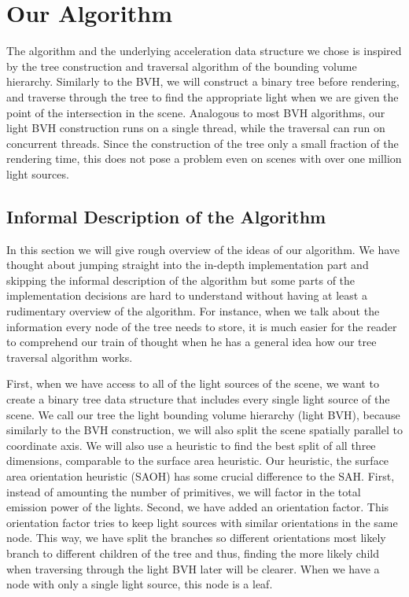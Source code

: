 
\chapter{Our Algorithm}
\label{ch:alg}

The algorithm and the underlying acceleration data structure we chose is inspired by the tree construction and traversal algorithm of the bounding volume hierarchy. Similarly to the BVH, we will construct a binary tree before rendering, and traverse through the tree to find the appropriate light when we are given the point of the intersection in the scene. Analogous to most BVH algorithms, our light BVH construction runs on a single thread, while the traversal can run on concurrent threads. Since the construction of the tree only a small fraction of the rendering time, this does not pose a problem even on scenes with over one million light sources.

\section{Informal Description of the Algorithm}
\label{sec:alg:idea}

In this section we will give rough overview of the ideas of our algorithm. We have thought about jumping straight into the in-depth implementation part and skipping the informal description of the algorithm but some parts of the implementation decisions are hard to understand without having at least a rudimentary overview of the algorithm. For instance, when we talk about the information every node of the tree needs to store, it is much easier for the reader to comprehend our train of thought when he has a general idea how our tree traversal algorithm works.

First, when we have access to all of the light sources of the scene, we want to create a binary tree data structure that includes every single light source of the scene. We call our tree the light bounding volume hierarchy (light BVH), because similarly to the BVH construction, we will also split the scene spatially parallel to coordinate axis. We will also use a heuristic to find the best split of all three dimensions, comparable to the surface area heuristic. Our heuristic, the surface area orientation heuristic (SAOH) has some crucial difference to the SAH. First, instead of amounting the number of primitives, we will factor in the total emission power of the lights. Second, we have added an orientation factor. This orientation factor tries to keep light sources with similar orientations in the same node. This way, we have split the branches so different orientations most likely branch to different children of the tree and thus, finding the more likely child when traversing through the light BVH later will be clearer. When we have a node with only a single light source, this node is a leaf.

